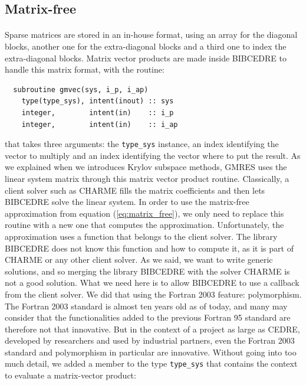     \subsection{Matrix-free}

      \paragraph{}
      Sparse matrices are stored in an in-house format, using an array for the diagonal blocks, another one for the extra-diagonal blocks and a third one to index the extra-diagonal blocks.
      Matrix vector products are made inside BIBCEDRE to handle this matrix format, with the routine:
\begin{verbatim}
  subroutine gmvec(sys, i_p, i_ap)
    type(type_sys), intent(inout) :: sys
    integer,        intent(in)    :: i_p
    integer,        intent(in)    :: i_ap
\end{verbatim}
      that takes three arguments: the \texttt{type_sys} instance, an index identifying the vector to multiply and an index identifying the vector where to put the result.
      As we explained when we introduces Krylov subspace methods, GMRES uses the linear system matrix through this matrix vector product routine.
      Classically, a client solver such as CHARME fills the matrix coefficients and then lets BIBCEDRE solve the linear system.
      In order to use the matrix-free approximation from equation (\ref{eq:matrix_free}), we only need to replace this routine with a new one that computes the approximation.
      Unfortunately, the approximation uses a function that belongs to the client solver.
      The library BIBCEDRE does not know this function and how to compute it, as it is part of CHARME or any other client solver.
      As we said, we want to write generic solutions, and so merging the library BIBCEDRE with the solver CHARME is not a good solution.
      What we need here is to allow BIBCEDRE to use a callback from the client solver.
      We did that using the Fortran 2003 feature: polymorphism.
      The Fortran 2003 standard is almost ten years old as of today, and many may consider that the functionalities added to the previous Fortran 95 standard are therefore not that innovative.
      But in the context of a project as large as CEDRE, developed by researchers and used by industrial partners, even the Fortran 2003 standard and polymorphism in particular are innovative.
      Without going into too much detail, we added a member to the type \texttt{type_sys} that contains the context to evaluate a matrix-vector product:

